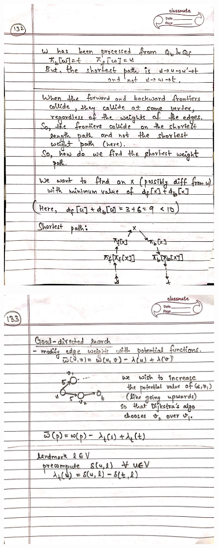 \begin{figure}[H]
    \centering
    \includegraphics[scale=0.25]{"./MIT 6.006/MIT_6006_132"}
\end{figure}
\newpage
\begin{figure}[H]
    \centering
    \includegraphics[scale=0.25]{"./MIT 6.006/MIT_6006_133"}
\end{figure}
